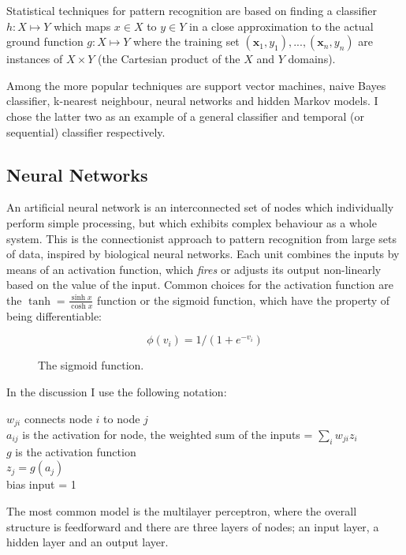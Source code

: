 \documentclass[12pt,a4,notitlepage]{report}
\renewcommand{\_}{\texttt{\symbol{95}}}
\newcommand{\<}{\texttt{\symbol{60}}}
\renewcommand{\>}{\texttt{\symbol{62}}}
\begin{document}
Statistical techniques for pattern recognition are based on finding a classifier
$ h: X \mapsto Y $ which maps $x \in X$ to $y \in Y$ in a close approximation to the actual ground function $ g: X \mapsto Y $ where the training set $ (\mathbf x_1,y_1), ... , (\mathbf x_n, y_n) $ are instances of $X \times Y$ (the Cartesian product of the $X$ and $Y$ domains).

Among the more popular techniques are support vector machines, naive Bayes classifier, k-nearest neighbour, neural networks and hidden Markov models. I chose the latter two as an example of a general classifier and temporal (or sequential) classifier respectively.

\subsection{Neural Networks}

An artificial neural network is an interconnected set of nodes which individually perform simple processing, but which exhibits complex behaviour as a whole system. This is the connectionist approach to pattern recognition from large sets of data, inspired by  biological neural networks. Each unit combines the inputs by means of an activation function, which {\em fires} or adjusts its output non-linearly based on the value of the input. Common choices for the activation function are the $\tanh = \frac{\sinh x}{\cosh x}$ function or the sigmoid function, which have the property of being differentiable:

\begin{figure}
\centering
\[ \phi(v_i) = 1/(1+e^{-v_i}) \]
\caption{The sigmoid function.}
\label{sigmoid}
\end{figure}

In the discussion I use the following notation:

$w_{ji}$ connects node $i$ to node $j$ \\
$a_{ij}$ is the activation for node, the weighted sum of the inputs = $\sum_i {w_{ji}z_i}$ \\
$g$ is the activation function \\
$z_j = g(a_j)$ \\
bias input = 1

The most common model is the multilayer perceptron\cite{NeuralPat}, where the overall structure is feedforward and there are three layers of nodes; an input layer, a hidden layer and an output layer.
\end{document}

